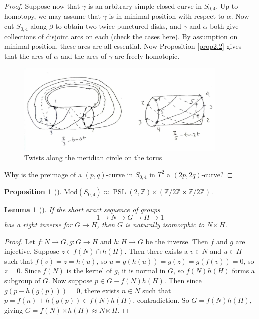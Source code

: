 \documentclass[reqno]{amsart}
\newtheorem{lemma}[theorem]{Lemma}
\newtheorem{proposition}[theorem]{Proposition}
\theoremstyle{definition}
\theoremstyle{remark}
\DeclareMathOperator{\PSL}{PSL}
\newcommand{\Mod}{{\mathrm{Mod}}}
\begin{document}
\begin{proof}
    
    Suppose now that
    $\gamma$ is an arbitrary simple closed curve
    in $S_{0,4}$. Up to homotopy, we may assume that
    $\gamma$ is in minimal position with respect to
    $\alpha$. Now cut $S_{0,4}$ along $\beta$ to
    obtain two twice-punctured disks, and $\gamma$ and
    $\alpha$ both give collections of disjoint
    arcs on each (check the cases here). By
    assumption on minimal position, these arcs
    are all essential. Now
    Proposition \ref{prop2.2} gives that
    the arcs of $\alpha$ and the arcs of $\gamma$ are
    freely homotopic.

    

    \begin{figure}[htpb]
        \centering
        \includegraphics[width=0.9\textwidth]{twists-along-curves-on-torus.jpg}
        \caption{Twists along the meridian circle on the torus}
        \label{fig:twists-along-curves-on-torus-jpg}
    \end{figure}


    Why is the preimage of a $\left( p,q \right) $-curve in
    $S_{0,4}$ in $T^2$ a $\left( 2p,2q \right) $-curve?

\end{proof}

\begin{proposition}[]\label{mcg-of-4-punctured-sphere}
    $\Mod \left( S_{0,4} \right) \approx
    \PSL \left( 2, \mathbb{Z} \right) \ltimes
    \left( \mathbb{Z}/ 2 \mathbb{Z} \times 
    \mathbb{Z} / 2 \mathbb{Z} \right) $.
\end{proposition}


\begin{lemma}[]
    If the short exact sequence of groups
    \[
    1 \to N \to G \to H \to 1
    \] 
    has a right inverse for $G \to H$, then
    $G$ is naturally isomorphic to
    $N \ltimes H$.
\end{lemma}

\begin{proof}
    Let $f \colon N \to G, g \colon G \to H$ and
    $h \colon H \to G$ be the inverse. Then
    $f$ and $g$ are injective. Suppose
    $z \in f(N) \cap h(H)$. Then there exists a
    $v \in N$ and $u \in H$ such that
    $f(v) = z = h(u)$, so 
    $u = g\left( h(u) \right) = g(z)
    = g(f(v)) = 0$, so $z = 0$.
    Since $f(N)$ is the kernel of $g$, it is
    normal in $G$, so $f(N) h(H)$ forms
    a subgroup of $G$. Now suppose
    $p \in G - f(N)h(H)$. Then since
    $g\left( p - h(g(p)) \right) = 0$, there
    exists $n \in N$ such that
    $p = f(n) + h(g(p)) \in f(N) h(H)$, contradiction.
    So $G = f(N) h(H)$, giving $G = f(N) \ltimes h(H)
    \approx N \ltimes H$.
\end{proof}
\end{document}
